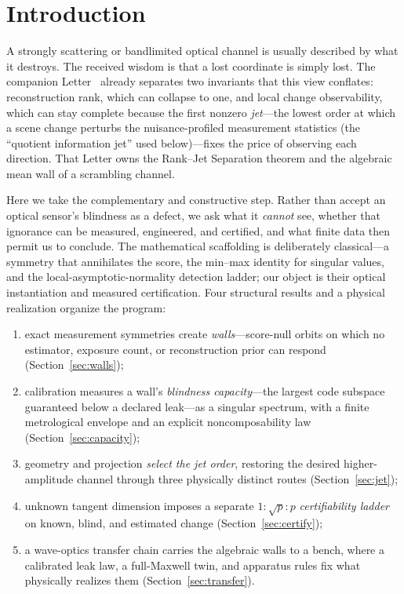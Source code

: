 \documentclass[10pt,twocolumn]{article}
\theoremstyle{plain}
\theoremstyle{definition}
\begin{document}
\section{Introduction}
A strongly scattering or bandlimited optical channel is usually described by what
it destroys. The received wisdom is that a lost coordinate is simply lost. The
companion Letter~\cite{COMPANION} already separates two invariants that this view
conflates: reconstruction rank, which can collapse to one, and local change
observability, which can stay complete because the first nonzero \emph{jet}---the
lowest order at which a scene change perturbs the nuisance-profiled measurement
statistics (the ``quotient information jet'' used below)---fixes the price of
observing each direction. That Letter owns the Rank--Jet Separation theorem and the
algebraic mean wall of a scrambling channel.

Here we take the complementary and constructive step. Rather than accept an
optical sensor's blindness as a defect, we ask what it \emph{cannot} see, whether
that ignorance can be measured, engineered, and certified, and what finite data
then permit us to conclude. The mathematical scaffolding is deliberately
classical---a symmetry that annihilates the score, the min--max identity for
singular values, and the local-asymptotic-normality detection ladder; our object is
their optical instantiation and measured certification. Four structural results and
a physical realization organize the program:

\begin{enumerate}\itemsep2pt
\item exact measurement symmetries create \emph{walls}---score-null orbits on
which no estimator, exposure count, or reconstruction prior can respond
(Section~\ref{sec:walls});
\item calibration measures a wall's \emph{blindness capacity}---the largest code
subspace guaranteed below a declared leak---as a singular spectrum, with a finite
metrological envelope and an explicit noncomposability law (Section~\ref{sec:capacity});
\item geometry and projection \emph{select the jet order}, restoring the desired
higher-amplitude channel through three physically distinct routes
(Section~\ref{sec:jet});
\item unknown tangent dimension imposes a separate $1:\sqrt{p}:p$
\emph{certifiability ladder} on known, blind, and estimated change
(Section~\ref{sec:certify});
\item a wave-optics transfer chain carries the algebraic walls to a bench, where a
calibrated leak law, a full-Maxwell twin, and apparatus rules fix what physically
realizes them (Section~\ref{sec:transfer}).
\end{enumerate}
\end{document}
